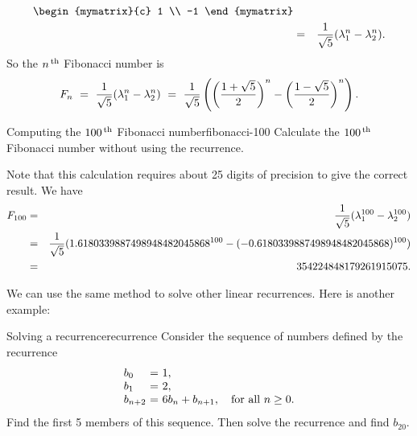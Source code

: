 \begin{solution}
\begin{eqnarray*}
        \begin{mymatrix}{c} 1 \\ -1 \end{mymatrix} \\
    &=& \frac{1}{\sqrt{5}} (\eigenvar_1^n - \eigenvar_2^n).
  \end{eqnarray*}
  So the $n^{\,\rm th}$ Fibonacci number is
  \begin{equation*}
    F_n
    ~=~ \frac{1}{\sqrt{5}} (\lambda_1^n - \lambda_2^n)
    ~=~ \frac{1}{\sqrt{5}}
    \left(\left(\frac{1+\sqrt{5}}{2}\right)^n - \left(\frac{1-\sqrt{5}}{2}\right)^n\right).
  \end{equation*}
\end{solution}

\begin{example}{Computing the $100^{\,\rm th}$ Fibonacci number}{fibonacci-100}
  Calculate the $100^{\,\rm th}$ Fibonacci number without using the recurrence.
\end{example}

\begin{solution}
  Note that this calculation requires about 25 digits of precision to
  give the correct result. We
  have
  \begin{eqnarray*}
    F_{100}
    &=& \frac{1}{\sqrt{5}} (\lambda_1^{100} - \lambda_2^{100}) \\
    &=& \frac{1}{\sqrt{5}} (1.6180339887498948482045868^{100} - (-0.6180339887498948482045868)^{100}) \\
    &=& 354224848179261915075.
  \end{eqnarray*}
\end{solution}

We can use the same method to solve other linear recurrences. Here is
another example:

\begin{example}{Solving a recurrence}{recurrence}
  Consider the sequence of numbers defined by the recurrence
  \begin{equation*}
    \begin{array}{l@{~}c@{~}l}
      b_0 &=& 1, \\
      b_1 &=& 2, \\
      b_{n+2} &=& 6b_n + b_{n+1}, \quad\mbox{for all $n\geq 0$.} \\
    \end{array}
  \end{equation*}
  Find the first 5 members of this sequence. Then solve the recurrence
  and find $b_{20}$.
\end{example}

